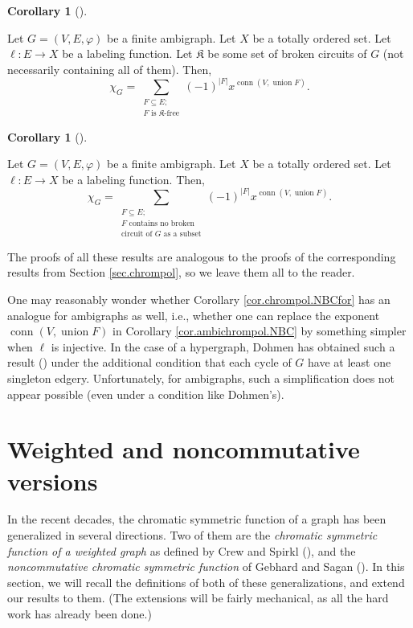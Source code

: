 \documentclass[numbers=enddot,12pt,final,onecolumn,notitlepage]{scrartcl}%
\theoremstyle{definition}
\newtheorem{coro}[theo]{Corollary}
\newenvironment{corollary}[1][]
{\begin{coro}[#1]\begin{leftbar}}
{\end{leftbar}\end{coro}}
\let\sumnonlimits\sum
\renewcommand{\sum}{\sumnonlimits\limits}
\begin{document}
\begin{corollary}
\label{cor.ambichrompol.K-free}Let $G=\left(  V,E,\varphi\right)  $ be a
finite ambigraph. Let $X$ be a totally ordered set. Let $\ell:E\rightarrow X$
be a labeling function. Let $\mathfrak{K}$ be some set of broken circuits of
$G$ (not necessarily containing all of them). Then,%
\[
\chi_{G}=\sum_{\substack{F\subseteq E;\\F\text{ is }\mathfrak{K}\text{-free}%
}}\left(  -1\right)  ^{\left\vert F\right\vert }x^{\operatorname*{conn}\left(
V,\operatorname*{union}F\right)  }.
\]

\end{corollary}

\begin{corollary}
\label{cor.ambichrompol.NBC}Let $G=\left(  V,E,\varphi\right)  $ be a finite
ambigraph. Let $X$ be a totally ordered set. Let $\ell:E\rightarrow X$ be a
labeling function. Then,%
\[
\chi_{G}=\sum_{\substack{F\subseteq E;\\F\text{ contains no broken}%
\\\text{circuit of }G\text{ as a subset}}}\left(  -1\right)  ^{\left\vert
F\right\vert }x^{\operatorname*{conn}\left(  V,\operatorname*{union}F\right)
}.
\]

\end{corollary}

The proofs of all these results are analogous to the proofs of the
corresponding results from Section \ref{sec.chrompol}, so we leave them all to
the reader.

One may reasonably wonder whether Corollary \ref{cor.chrompol.NBCfor} has an
analogue for ambigraphs as well, i.e., whether one can replace the exponent
$\operatorname*{conn}\left(  V,\operatorname*{union}F\right)  $ in Corollary
\ref{cor.ambichrompol.NBC} by something simpler when $\ell$ is injective. In
the case of a hypergraph, Dohmen has obtained such a result (\cite[Theorem
2.1]{Dohmen95}) under the additional condition that each cycle of $G$ have at
least one singleton edgery. Unfortunately, for ambigraphs, such a
simplification does not appear possible (even under a condition like Dohmen's).

\section{\label{sec.weigh}Weighted and noncommutative versions}

In the recent decades, the chromatic symmetric function of a graph has been
generalized in several directions. Two of them are the \emph{chromatic
symmetric function of a weighted graph} as defined by Crew and Spirkl
(\cite[\S 3]{CreSpi19}), and the \emph{noncommutative chromatic symmetric
function} of Gebhard and Sagan (\cite[\S 3]{GebSag01}). In this section, we
will recall the definitions of both of these generalizations, and extend our
results to them. (The extensions will be fairly mechanical, as all the hard
work has already been done.)
\end{document}
